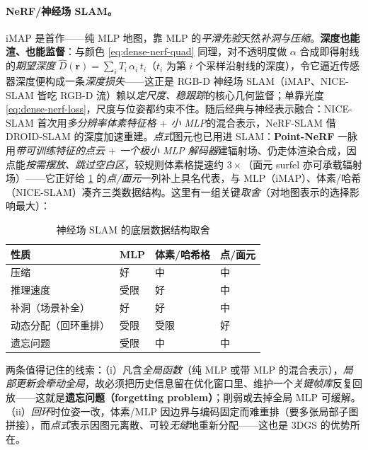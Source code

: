 \paragraph{NeRF/神经场 SLAM。}
iMAP\cite{sucar2021imap} 是首作——纯 MLP 地图，靠 MLP 的\emph{平滑先验}天然\emph{补洞与压缩}。\textbf{深度也能渲、也能监督}：与颜色 \cref{eq:dense-nerf-quad} 同理，对不透明度做 $\alpha$ 合成即得射线的\emph{期望深度} $\hat D(\mathbf{r})=\sum_i T_i\,\alpha_i\,t_i$（$t_i$ 为第 $i$ 个采样沿射线的深度），令它逼近传感器深度便构成一条\emph{深度损失}——这正是 RGB-D 神经场 SLAM（iMAP、NICE-SLAM 皆吃 RGB-D 流）赖以\emph{定尺度、稳跟踪}的核心几何监督；单靠光度 \cref{eq:dense-nerf-loss}，尺度与位姿都约束不住。随后经典与神经表示融合：NICE-SLAM\cite{zhu2022niceslam} 首次用\emph{多分辨率体素特征格 $+$ 小 MLP}的混合表示，NeRF-SLAM\cite{rosinol2023nerfslam} 借 DROID-SLAM 的深度加速重建。\emph{点式}图元也已用进 SLAM：\textbf{Point-NeRF} 一脉用\emph{带可训练特征的点云 $+$ 一个极小 MLP 解码器}建辐射场、仍走体渲染合成，因点能\emph{按需摆放、跳过空白区}，较规则体素格提速约 $3\times$（面元 surfel 亦可承载辐射场）——它正好给 \cref{tab:dense-neuralfield} 的\emph{点/面元}一列补上具名代表，与 MLP（iMAP）、体素/哈希（NICE-SLAM）凑齐三类数据结构。这里有一组关键\emph{取舍}（对地图表示的选择影响最大）：

\begin{table}[H]\centering\small
\caption{神经场 SLAM 的底层数据结构取舍\cite{sucar2021imap,zhu2022niceslam}}
\label{tab:dense-neuralfield}
\begin{tabular}{p{} p{} p{} p{}}
\toprule
性质 & MLP & 体素/哈希格 & 点/面元 \\
\midrule
压缩 & 好 & 中 & 中 \\
推理速度 & 受限 & 好 & 中 \\
补洞（场景补全） & 好 & 好 & 中 \\
动态分配（回环重排） & 受限 & 受限 & 好 \\
遗忘问题 & 受限 & 中 & 中 \\
\bottomrule
\end{tabular}
\end{table}

\noindent{}两条值得记住的线索：（i）凡含\emph{全局函数}（纯 MLP 或带 MLP 的混合表示），\emph{局部更新会牵动全局}，故必须把历史信息留在优化窗口里、维护一个\emph{关键帧库}反复回放——这就是\textbf{遗忘问题（forgetting problem）}；削弱或去掉全局 MLP 可缓解。（ii）\emph{回环}时位姿一改，体素/MLP 因边界与编码固定而难重排（要多张局部子图拼接），而\emph{点式}表示因图元离散、可较\emph{无缝}地重新分配——这也是 3DGS 的优势所在。

